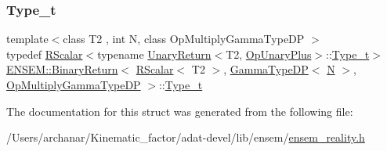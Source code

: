 \subsubsection{\texorpdfstring{Type\_t}{Type\_t}\hspace{0.1cm}{\footnotesize\ttfamily [3/3]}}
{\footnotesize\ttfamily template$<$class T2 , int N, class Op\+Multiply\+Gamma\+Type\+DP $>$ \\
typedef \mbox{\hyperlink{classENSEM_1_1RScalar}{R\+Scalar}}$<$typename \mbox{\hyperlink{structENSEM_1_1UnaryReturn}{Unary\+Return}}$<$T2, \mbox{\hyperlink{structENSEM_1_1OpUnaryPlus}{Op\+Unary\+Plus}}$>$\+::\mbox{\hyperlink{structENSEM_1_1BinaryReturn_3_01RScalar_3_01T2_01_4_00_01GammaTypeDP_3_01N_01_4_00_01OpMultiplyGammaTypeDP_01_4_adb37425bc694707a47d331752227a361}{Type\+\_\+t}}$>$ \mbox{\hyperlink{structENSEM_1_1BinaryReturn}{E\+N\+S\+E\+M\+::\+Binary\+Return}}$<$ \mbox{\hyperlink{classENSEM_1_1RScalar}{R\+Scalar}}$<$ T2 $>$, \mbox{\hyperlink{classENSEM_1_1GammaTypeDP}{Gamma\+Type\+DP}}$<$ \mbox{\hyperlink{adat__devel_2lib_2hadron_2operator__name__util_8cc_a7722c8ecbb62d99aee7ce68b1752f337}{N}} $>$, \mbox{\hyperlink{structENSEM_1_1OpMultiplyGammaTypeDP}{Op\+Multiply\+Gamma\+Type\+DP}} $>$\+::\mbox{\hyperlink{structENSEM_1_1BinaryReturn_3_01RScalar_3_01T2_01_4_00_01GammaTypeDP_3_01N_01_4_00_01OpMultiplyGammaTypeDP_01_4_adb37425bc694707a47d331752227a361}{Type\+\_\+t}}}



The documentation for this struct was generated from the following file\+:\begin{DoxyCompactItemize}
\item 
/\+Users/archanar/\+Kinematic\+\_\+factor/adat-\/devel/lib/ensem/\mbox{\hyperlink{adat-devel_2lib_2ensem_2ensem__reality_8h}{ensem\+\_\+reality.\+h}}\end{DoxyCompactItemize}
